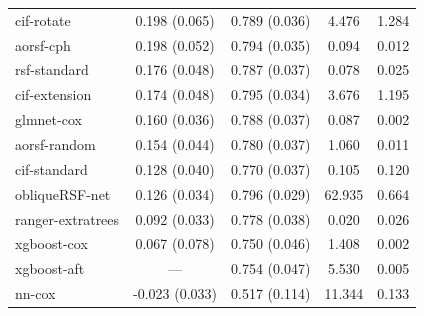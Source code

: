 \documentclass[twoside,11pt]{article}\usepackage[]{graphicx}\usepackage[]{xcolor}
\newenvironment{knitrout}{}{} %
\begin{document}
\begin{knitrout}
\begin{longtable}[t]{lcccc}
\hspace{1em}cif-rotate & 0.198 (0.065) & 0.789 (0.036) & 4.476 & 1.284\\
\hspace{1em}aorsf-cph & 0.198 (0.052) & 0.794 (0.035) & 0.094 & 0.012\\
\hspace{1em}rsf-standard & 0.176 (0.048) & 0.787 (0.037) & 0.078 & 0.025\\
\hspace{1em}cif-extension & 0.174 (0.048) & 0.795 (0.034) & 3.676 & 1.195\\
\hspace{1em}glmnet-cox & 0.160 (0.036) & 0.788 (0.037) & 0.087 & 0.002\\
\hspace{1em}aorsf-random & 0.154 (0.044) & 0.780 (0.037) & 1.060 & 0.011\\
\hspace{1em}cif-standard & 0.128 (0.040) & 0.770 (0.037) & 0.105 & 0.120\\
\hspace{1em}obliqueRSF-net & 0.126 (0.034) & 0.796 (0.029) & 62.935 & 0.664\\
\hspace{1em}ranger-extratrees & 0.092 (0.033) & 0.778 (0.038) & 0.020 & 0.026\\
\hspace{1em}xgboost-cox & 0.067 (0.078) & 0.750 (0.046) & 1.408 & 0.002\\
\hspace{1em}xgboost-aft & --- & 0.754 (0.047) & 5.530 & 0.005\\
\hspace{1em}nn-cox & -0.023 (0.033) & 0.517 (0.114) & 11.344 & 0.133\\*
\end{longtable}

\end{knitrout}
\end{document}
